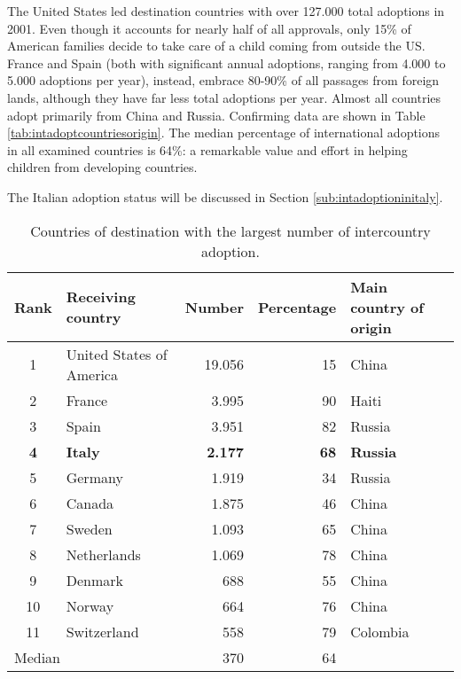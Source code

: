 The United States led destination countries with over 127.000 total adoptions in 2001. Even though it accounts for nearly half of all approvals, only 15\% of American families decide to take care of a child coming from outside the US. France and Spain (both with significant annual adoptions, ranging from 4.000 to 5.000 adoptions per year), instead, embrace 80-90\% of all passages from foreign lands, although they have far less total adoptions per year. Almost all countries adopt primarily from China and Russia. Confirming data are shown in Table \ref{tab:intadoptcountriesorigin}. The median percentage of international adoptions in all examined countries is 64\%: a remarkable value and effort in helping children from developing countries.

The Italian adoption status will be discussed in Section \ref{sub:intadoptioninitaly}.

\begin{table}[H]
   \centering
   \begin{tabular}{c l r r l}
      Rank & Receiving country\footnotemark[1] & Number & Percentage & Main country of origin\\
      \hline
      1 & United States of America & 19.056 & 15 & China\\
      2 & France & 3.995 & 90 & Haiti\\
      3 & Spain & 3.951 & 82 & Russia\\
      \textcolor{BrickRed}{\textbf{4}} & \textcolor{BrickRed}{\textbf{Italy}} & \textcolor{BrickRed}{\textbf{2.177}} & \textcolor{BrickRed}{\textbf{68}} & \textcolor{BrickRed}{\textbf{Russia}}\\
      5 & Germany & 1.919 & 34 & Russia\\
      6 & Canada & 1.875 & 46 & China\\
      7 & Sweden & 1.093 & 65 & China\\
      8 & Netherlands & 1.069 & 78 & China\\
      9 & Denmark & 688 & 55 & China\\
      10 & Norway & 664 & 76 & China\\
      11 & Switzerland & 558 & 79 & Colombia\\
      \hline
      \multicolumn{2}{l}{Median} & 370 & 64 &\\
   \end{tabular}
   \caption{Countries of destination with the largest number of intercountry adoption.}
    \label{tab:intadoptcountriesdestination}
\end{table}

